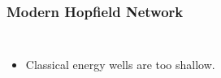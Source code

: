 \begin{frame}
	
    \frametitle{Modern Hopfield Network}
    \begin{columns}[c]
        \begin{itemize}
            \item Classical energy wells are too shallow.          
        \end{itemize}
        
        

\end{columns}
\end{frame}
